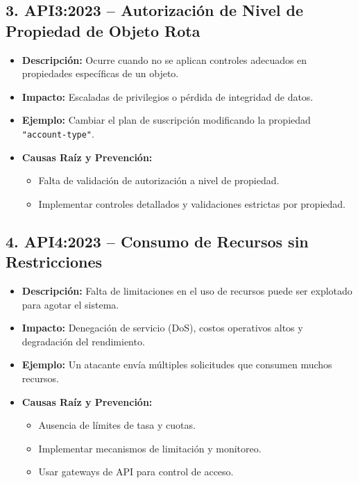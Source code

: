 \documentclass[a4paper,12pt]{article}
\begin{document}
\subsection{3. API3:2023 – Autorización de Nivel de Propiedad de Objeto Rota}

\begin{itemize}
    \item \textbf{Descripción:} Ocurre cuando no se aplican controles adecuados en propiedades específicas de un objeto.
    \item \textbf{Impacto:} Escaladas de privilegios o pérdida de integridad de datos.
    \item \textbf{Ejemplo:} Cambiar el plan de suscripción modificando la propiedad \texttt{"account-type"}.
    \item \textbf{Causas Raíz y Prevención:}
    \begin{itemize}
        \item Falta de validación de autorización a nivel de propiedad.
        \item Implementar controles detallados y validaciones estrictas por propiedad.
    \end{itemize}
\end{itemize}

\subsection{4. API4:2023 – Consumo de Recursos sin Restricciones}
\begin{itemize}
    \item \textbf{Descripción:} Falta de limitaciones en el uso de recursos puede ser explotado para agotar el sistema.
    \item \textbf{Impacto:} Denegación de servicio (DoS), costos operativos altos y degradación del rendimiento.
    \item \textbf{Ejemplo:} Un atacante envía múltiples solicitudes que consumen muchos recursos.
    \item \textbf{Causas Raíz y Prevención:}
    \begin{itemize}
        \item Ausencia de límites de tasa y cuotas.
        \item Implementar mecanismos de limitación y monitoreo.
        \item Usar gateways de API para control de acceso.
    \end{itemize}
\end{itemize}
\end{document}
